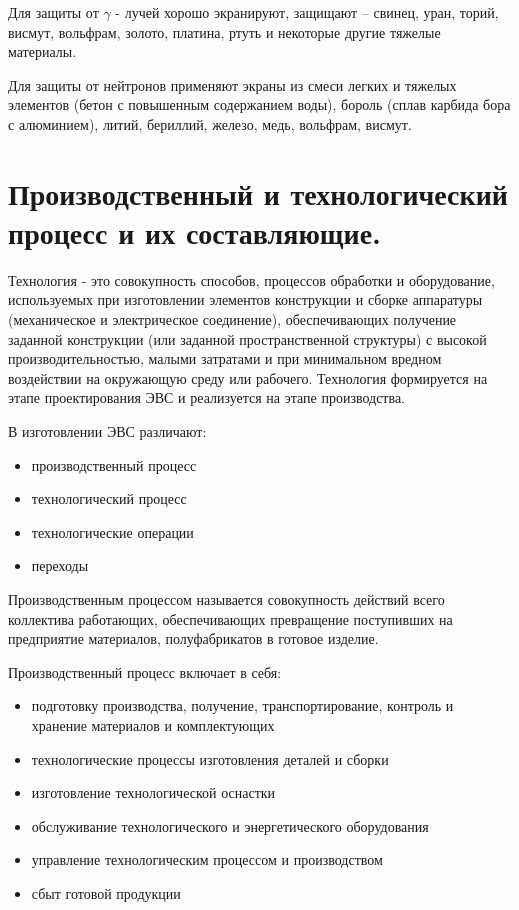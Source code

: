 \documentclass[unicode, 12pt, a4paper, oneside]{article}
\begin{document}
Для защиты от $\gamma$ - лучей хорошо экранируют, защищают – свинец, уран, торий, висмут, вольфрам, золото, платина, ртуть и некоторые другие тяжелые материалы.

Для защиты от нейтронов применяют экраны из смеси легких и тяжелых элементов (бетон с повышенным содержанием воды), бороль (сплав карбида бора с алюминием), литий, бериллий, железо, медь, вольфрам, висмут.


\section{Производственный и технологический процесс и их составляющие.}

Технология - это совокупность способов, процессов обработки и оборудование, используемых при изготовлении элементов конструкции и сборке аппаратуры (механическое и электрическое соединение), обеспечивающих получение заданной конструкции (или заданной пространственной структуры) с высокой производительностью, малыми затратами и при минимальном вредном воздействии на окружающую среду или рабочего. Технология формируется на этапе проектирования ЭВС и реализуется на этапе производства.

В изготовлении ЭВС различают:

\begin{itemize}
\item производственный процесс
\item технологический процесс
\item технологические операции
\item переходы
\end{itemize}

Производственным процессом называется совокупность действий всего коллектива работающих, обеспечивающих превращение поступивших на предприятие материалов, полуфабрикатов в готовое изделие.

Производственный процесс  включает в себя:

\begin{itemize}
\item подготовку производства, получение, транспортирование, контроль и хранение материалов и комплектующих
\item технологические процессы изготовления деталей и сборки
\item изготовление технологической оснастки
\item обслуживание технологического и энергетического оборудования
\item управление технологическим процессом и производством
\item сбыт готовой продукции
\end{itemize}
\end{document}
